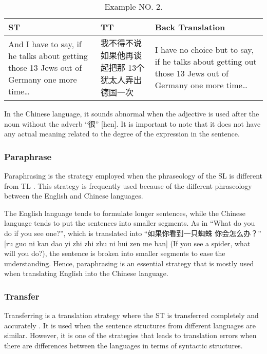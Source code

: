 \documentclass[english]{textolivre}
\begin{document}
\begin{table}[htpb]
\caption{Example NO. 2.}
\label{tbl02}
\begin{tabularx}{\linewidth}{XXX}
\toprule 
ST  & TT & Back Translation \\ 
\midrule
And I have to say, if he talks about getting those 13 Jews out of Germany one more time… & 我不得不说 如果他再谈起把那 13个犹太人弄出德国一次  & I have no choice but to say, if he talks about getting out those 13 Jews out of Germany one more time… \\ 
\bottomrule
\end{tabularx}
\end{table}

In the Chinese language, it sounds abnormal when the adjective is used after the noun without the adverb “很” [hen]. It is important to note that it does not have any actual meaning related to the degree of the expression in the sentence.  

\subsubsection{Paraphrase}
Paraphrasing is the strategy employed when the phraseology of the SL is different from TL \cite{gottlieb_1992}. This strategy is frequently used because of the different phraseology between the English and Chinese languages. 

The English language tends to formulate longer sentences, while the Chinese language tends to put the sentences into smaller segments. As in “What do you do if you see one?”, which is translated into “如果你看到一只蜘蛛 你会怎么办？” [ru guo ni kan dao yi zhi zhi zhu ni hui zen me ban] (If you see a spider, what will you do?), the sentence is broken into smaller segments to ease the understanding. Hence, paraphrasing is an essential strategy that is mostly used when translating English into the Chinese language. 

\subsubsection{Transfer}
Transferring is a translation strategy where the ST is transferred completely and accurately \cite{gottlieb_1992}. It is used when the sentence structures from different languages are similar. However, it is one of the strategies that leads to translation errors when there are differences between the languages in terms of syntactic structures.
\end{document}
